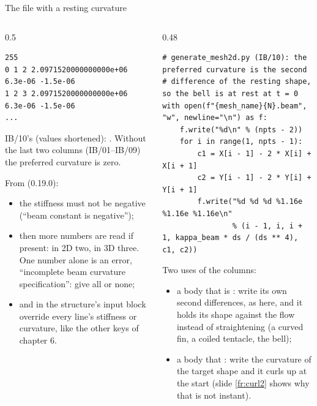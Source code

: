 \documentclass[aspectratio=169,11pt]{beamer}
\begin{document}
\begin{frame}[fragile]{The  file with a resting curvature}
\label{fr:beamfile}
\begin{columns}[T,onlytextwidth]
\begin{column}{0.5\textwidth}
\begin{lstlisting}[style=data]
255
0 1 2 2.0971520000000000e+06 6.3e-06 -1.5e-06
1 2 3 2.0971520000000000e+06 6.3e-06 -1.5e-06
...
\end{lstlisting}
\footnotesize IB/10's  (values shortened): . Without the last two columns (IB/01--IB/09) the preferred curvature is zero.
\vspace{1mm}

\footnotesize From  (0.19.0):
\begin{itemize}
  \item the stiffness must not be negative (``beam constant is negative'');
  \item then  more numbers are read if present: in 2D two, in 3D three. One number alone is an error, ``incomplete beam curvature specification'': give all or none;
  \item {} and  in the structure's input block override every line's stiffness or curvature, like the other  keys of chapter 6.
\end{itemize}
\end{column}
\begin{column}{0.48\textwidth}
\begin{lstlisting}[style=pythontiny]
# generate_mesh2d.py (IB/10): the preferred curvature is the second
# difference of the resting shape, so the bell is at rest at t = 0
with open(f"{mesh_name}{N}.beam", "w", newline="\n") as f:
    f.write("%d\n" % (npts - 2))
    for i in range(1, npts - 1):
        c1 = X[i - 1] - 2 * X[i] + X[i + 1]
        c2 = Y[i - 1] - 2 * Y[i] + Y[i + 1]
        f.write("%d %d %d %1.16e %1.16e %1.16e\n"
                % (i - 1, i, i + 1, kappa_beam * ds / (ds ** 4), c1, c2))
\end{lstlisting}
\footnotesize Two uses of the columns:
\begin{itemize}
  \item a body that is : write its own second differences, as here, and it holds its shape against the flow instead of straightening (a curved fin, a coiled tentacle, the bell);
  \item a body that : write the curvature of the target shape and it curls up at the start (slide \ref{fr:curl2} shows why that is not instant).
\end{itemize}
\end{column}
\end{columns}
\end{frame}
\end{document}
